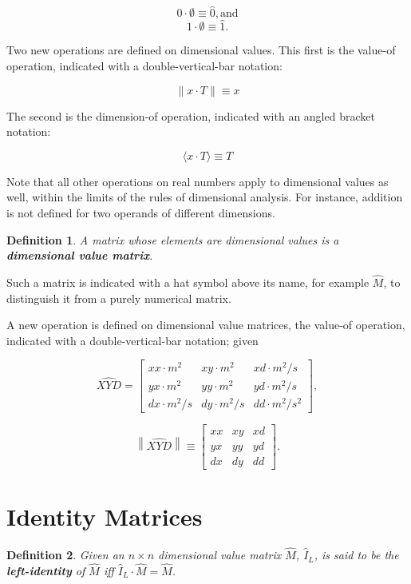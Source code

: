 \documentclass[10pt,letterpaper]{article}
\newtheorem{defn}{Definition}[section]
\numberwithin{equation}{section}
\begin{document}
 \[ 0 \cdot \emptyset \equiv \hat 0, \mbox{and} \]
 \[ 1 \cdot \emptyset \equiv \hat 1. \]

Two new operations are defined on dimensional values.  This first is
the value-of operation, indicated with a double-vertical-bar
notation:

\[ \| x \cdot T \| \equiv x \]

The second is the dimension-of operation, indicated with an angled
bracket notation:

\[ \langle x \cdot T \rangle \equiv T \]

Note that all other operations on real numbers apply to dimensional
values as well, within the limits of the rules of dimensional
analysis.  For instance, addition is not defined for two operands of
different dimensions.


\begin{defn}A matrix whose elements are dimensional values is a
  \textbf{dimensional value matrix}.\end{defn}

Such a matrix is indicated with a hat symbol above its name, for
example $\hat M$, to distinguish it from a purely numerical matrix.

A new operation is defined on dimensional value matrices, the value-of
operation, indicated with a double-vertical-bar notation; given

\[ \widehat{XYD} = \left[ \begin{matrix} 
  xx \cdot m^2 & xy \cdot m^2 & xd \cdot m^2/s \\
  yx \cdot m^2 & yy \cdot m^2 & yd \cdot m^2/s \\
  dx \cdot m^2/s & dy \cdot m^2/s & dd \cdot m^2/s^2
 \end{matrix} \right], \]
 
 \[ \left\| \widehat{XYD} \right\| \equiv \left[ \begin{matrix} 
  xx & xy & xd \\
  yx & yy & yd \\
  dx & dy & dd
 \end{matrix} \right]. \]
 
\section{Identity Matrices}

\begin{defn}Given an $n \times n$ dimensional value matrix $\hat M$,
  $\hat I_L$, is said to be the \textbf{left-identity} of $\hat M$ iff
  $\hat I_L \cdot \hat M = \hat M$.\end{defn}
\end{document}
